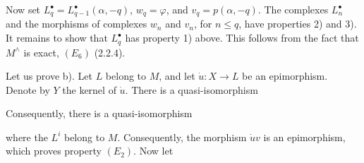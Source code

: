 \clearpage
{}%
\begingroup\small\setlength{\parskip}{0pt}\setlength{\emergencystretch}{1.5em}
\setlength{\abovedisplayskip}{4pt plus 2pt minus 2pt}%
\setlength{\belowdisplayskip}{4pt plus 2pt minus 2pt}%

Now set $L_q^\bullet=L_{q-1}^\bullet(\alpha,-q)$,
$w_q=\varphi$, and $v_q=p(\alpha,-q)$. The complexes $L_n^\bullet$ and the
morphisms of complexes $w_n$ and $v_n$, for $n\leq q$, have properties 2)
and 3). It remains to show that $L_q^\bullet$ has property 1) above. This
follows from the fact that $M^\wedge$ is exact, $(E_6)$ (2.2.4).

Let us prove b). Let $L$ belong to $M$, and let
$\dot u\colon X\longrightarrow L$ be an epimorphism. Denote by $Y$ the
kernel of $\dot u$. There is a quasi-isomorphism

\begin{center}
\end{center}
Consequently, there is a quasi-isomorphism

\begin{center}
\end{center}

where the $L^i$ belong to $M$. Consequently, the morphism $\dot u v$ is an
epimorphism, which proves property $(E_2)$. Now let

